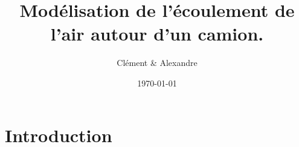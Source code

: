 \documentclass[11pt]{article}
\author{Clément \bsc{Rousseau} \& Alexandre \bsc{Vieira}}
\title{Modélisation de l'écoulement de l'air autour d'un camion.}
\date{\today}
\begin{document}

\section*{Introduction}



\end{document}
